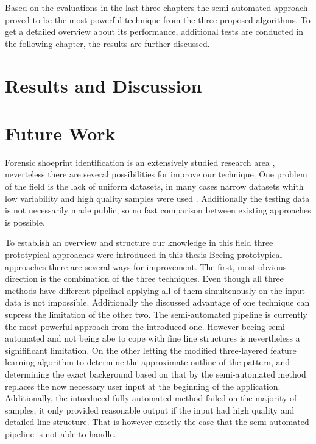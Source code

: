 \documentclass[draft,final]{vutinfth} %
\begin{document}
\par
Based on the evaluations in the last three chapters the semi-automated approach proved to be the most powerful technique from the three proposed algorithms.
To get a detailed overview about its performance, additional tests are conducted in the following chapter, the results are further discussed.

\chapter{Results and Discussion}

\chapter{Future Work}
\par
Forensic shoeprint identification is an extensively studied research area \cite{rida2019forensic}, neverteless there are several possibilities for improve our technique.
One problem of the field is the lack of uniform datasets, in many cases narrow datasets whith low variability and high quality samples were used  \cite{rida2019forensic}.
Additionally the testing data is not necessarily made public, so no fast comparison between existing approaches is possible.
\par
To establish an overview and structure our knowledge in this field three prototypical approaches were introduced in this thesis
Beeing prototypical approaches there are several ways for improvement.
The first, most obvious direction is the combination of the three techniques.
Even though all three methods have different pipelinel applying all of them simultenously on the input data is not impossible.
Additionally the discussed advantage of one technique can supress the limitation of the other two.
The semi-automated pipeline is currently the most powerful approach from the introduced one.
However beeing semi-automated and not being abe to cope with fine line structures is nevertheless a signifificant limitation.
On the other letting the modified three-layered feature learning algorithm to determine the approximate outline of the pattern, and determining the exact background based on that by the semi-automated method replaces the now necessary user input at the beginning of the application.
Additionally, the intorduced fully automated method failed on the majority of samples, it only provided reasonable output if the input had high quality and detailed line structure.
That is however exactly the case that the semi-automated pipeline is not able to handle.
\end{document}
